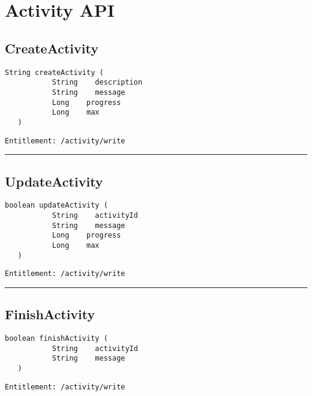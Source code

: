 \chapter{Activity API}

\section{CreateActivity}
\label{Api:CreateActivity}
\begin{lstlisting}[style=nonumbers]
   String createActivity (
           String    description
           String    message
           Long    progress
           Long    max
   )
\end{lstlisting}
\begin{Verbatim}[formatcom=\color{Maroon}]
  Entitlement: /activity/write
\end{Verbatim}



\rule{12cm}{2pt}
\section{UpdateActivity}
\label{Api:UpdateActivity}
\begin{lstlisting}[style=nonumbers]
   boolean updateActivity (
           String    activityId
           String    message
           Long    progress
           Long    max
   )
\end{lstlisting}
\begin{Verbatim}[formatcom=\color{Maroon}]
  Entitlement: /activity/write
\end{Verbatim}



\rule{12cm}{2pt}
\section{FinishActivity}
\label{Api:FinishActivity}
\begin{lstlisting}[style=nonumbers]
   boolean finishActivity (
           String    activityId
           String    message
   )
\end{lstlisting}
\begin{Verbatim}[formatcom=\color{Maroon}]
  Entitlement: /activity/write
\end{Verbatim}



